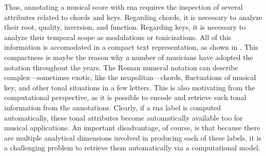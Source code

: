 Thus, annotating a musical score with \gls{rna} requires the
inspection of several attributes related to chords and keys.
Regarding chords, it is necessary to analyze their root,
quality, inversion, and function. Regarding keys, it is
necessary to analyze their temporal scope as modulations or
tonicizations. All of this information is accomodated in a
compact text representation, as shown in
. This compactness is maybe
the reason why a number of musicians have adopted the
notation throughout the years. The Roman numeral notation
can describe complex---sometimes exotic, like the
\gls{neapolitan}---chords, fluctuations of musical key, and
other tonal situations in a few letters. This is also
motivating from the computational perspective, as it is
possible to encode and retrieve such tonal information from
the annotations. Clearly, if a \gls{rna} label is computed
automatically, these tonal attributes become automatically
available too for musical applications. An important
disadvantage, of course, is that because there are multiple
analytical dimensions involved in producing each of these
labels, it is a challenging problem to retrieve them
automatically via a computational model.






